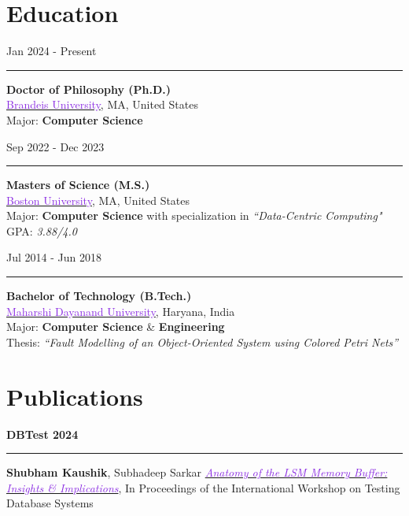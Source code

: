 \documentclass[10pt,a4paper,calibri]{moderncv}
\newcommand{\beforesection}{\vspace{-0.5em}}
\newcommand{\mediumspace}{\vspace{0.5em}}
\newcommand{\education}[2]{
  \noindent
  \begin{minipage}[c]{0.20\textwidth}
    \hfill
    #1
  \end{minipage}%
  \hspace{0.01\textwidth}
  \begin{minipage}[c]{0.02\textwidth}
    \textcolor{lightgray}{\rule{1pt}{1.6cm}}
  \end{minipage}%
  \begin{minipage}[c]{0.80\textwidth}
    \raggedright{
    #2
    }
  \end{minipage}%
}
\newcommand{\publications}[2]{
  \noindent
  \begin{minipage}[c]{0.15\textwidth}
    \centering
      \textbf{#1}
  \end{minipage}%
  \hspace{0.01\textwidth}
  \begin{minipage}[c]{0.02\textwidth}
    \textcolor{lightgray}{\rule{1pt}{0.75cm}}
  \end{minipage}%
  \begin{minipage}[c]{0.80\textwidth}
    \raggedright{
    #2
    }
  \end{minipage}%
}
\begin{document}
\beforesection

\section{Education}
\noindent
\begin{minipage}[c]{0.20\textwidth}
  \hfill
  Jan 2024 \-- Present
\end{minipage}%
\hspace{0.01\textwidth}
\begin{minipage}[c]{0.02\textwidth}
  \textcolor{lightgray}{\rule{1pt}{1.2cm}}
\end{minipage}%
\begin{minipage}[c]{0.80\textwidth}
  \raggedright{
    \textbf{Doctor of Philosophy (Ph.D.)}\\
    \href{https://www.brandeis.edu/}{\textcolor{blueviolet}{Brandeis University}}, MA, United States\\
    Major: \textbf{Computer Science}\\
  }
\end{minipage}%

\mediumspace

\education{Sep 2022 \-- Dec 2023}
{
  \textbf{Masters of Science (M.S.)}\\
  \href{https://www.bu.edu/}{\textcolor{blueviolet}{Boston University}}, MA, United States\\
  Major: \textbf{Computer Science} with specialization in \textit{“Data-Centric Computing"}\\
  GPA: \textit{3.88/4.0}
}

\mediumspace

\education{Jul 2014 \-- Jun 2018}
{
  \textbf{Bachelor of Technology (B.Tech.)}\\
  \href{https://mdu.ac.in/}{\textcolor{blueviolet}{Maharshi Dayanand University}}, Haryana, India\\
  Major: \textbf{Computer Science} \& \textbf{Engineering}\\
  Thesis: \textit{“Fault Modelling of an Object-Oriented System using Colored Petri Nets”}\\
}

\beforesection

\section{Publications}
\publications{DBTest 2024}{\textbf{Shubham Kaushik}, Subhadeep Sarkar \href{https://doi.org/10.1145/3662165.3662766}{\textit{\textcolor{blueviolet}{Anatomy 
of the LSM Memory Buffer: Insights \& Implications}}}, In Proceedings of the International Workshop on Testing Database Systems}
\end{document}
